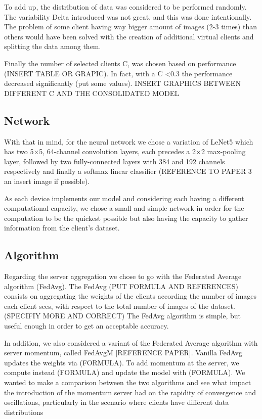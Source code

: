\documentclass[twocolumn]{article}
\begin{document}
To add up, the distribution of data was considered to be performed randomly. The variability Delta introduced was not great, and this was done intentionally. The problem of some client having way bigger amount of images (2-3 times) than others would have been solved with the creation of additional virtual clients and splitting the data among them. 

Finally the number of selected clients C, was chosen based on performance (INSERT TABLE OR GRAPIC). In fact, with a C <0.3 the performance decreased significantly (put some values).
INSERT GRAPHICS BETWEEN DIFFERENT C AND THE CONSOLIDATED MODEL

\subsection{Network}

With that in mind, for the neural network we chose a variation of LeNet5 which has two 5×5, 64-channel convolution layers, each precedes a 2×2 max-pooling layer, followed by two fully-connected layers with 384 and 192 channels respectively and finally a softmax linear classifier (REFERENCE TO PAPER 3 an insert image if possible). 

As each device implements our model and considering each having a different computational capacity, we chose a small and simple network in order for the computation to be the quickest possible but also having the capacity to gather information from the client's dataset.

\subsection{Algorithm}
Regarding the server aggregation we chose to go with the Federated Average algorithm (FedAvg). The FedAvg (PUT FORMULA AND REFERENCES) consists on aggregating the weights of the clients according the number of images each client sees, with respect to the total number of images of the dataset.(SPECIFIY MORE AND CORRECT)
The FedAvg algorithm is simple, but useful enough in order to get an acceptable accuracy.

In addition, we also considered a variant of the Federated Average algorithm with server momentum, called FedAvgM [REFERENCE PAPER]. Vanilla FedAvg updates the weights via (FORMULA). To add momentum at the server, we compute instead (FORMULA) and update the model with (FORMULA). 
We wanted to make a comparison between the two algorithms and see what impact the introduction of the momentum server had on the rapidity of convergence and oscillations, particularly in the scenario where clients have different data distributions
\end{document}
